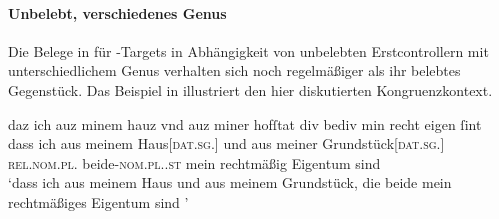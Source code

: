 
\paragraph{Unbelebt, verschiedenes Genus}

Die Belege in  für -Targets in
Abhängigkeit von unbelebten Erstcontrollern mit
unterschiedlichem Genus verhalten sich noch regelmäßiger als ihr belebtes
Gegenstück. Das Beispiel in  illustriert den hier
diskutierten Kongruenzkontext.

\begin{exe}
\ex \label{ex:cao_diffgend_inan}
		\gll daz ich auz minem hauz vnd auz miner hofſtat
				div bediv min recht eigen ſint \textelp{} \\
			dass ich aus meinem Haus[\textsc{dat.sg.\NeutI}] und aus meiner
				Grundstück[\textsc{dat.sg.\FemI}] \textsc{rel.nom.pl.\NeutI}
				beide-\textsc{nom.pl.\NeutI.st} mein rechtmäßig Eigentum sind \\
		\trans `dass ich aus meinem Haus und aus meinem Grundstück, die 
			beide mein rechtmäßiges Eigentum sind \textelp{}'
			\parencites(Nr.~1282, Regensburg, 1290)[526,37--38]{cao2}

\end{exe}


